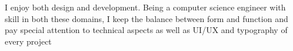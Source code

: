 \cventry{}
    {}
    {I enjoy both design and development. Being a computer science engineer with skill in both these domains, I keep the balance between form and function and pay special attention to technical aspects as well as UI/UX and typography of every project}
    {}
    {}
    {}
    \vspace*{0.2\baselineskip}


